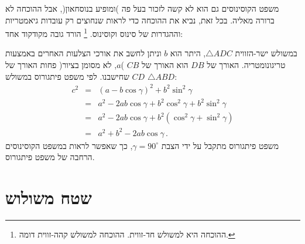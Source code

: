 \documentclass[12pt,a4paper]{article}
\begin{document}
משפט הקוסינוסים גם הוא לא קשה לזכור בעל פה )ומופיע בנוסחאון(, אבל ההוכחה לא ברורה מאליה. בכל זאת, נביא את ההוכחה כדי לראות שנחוצים רק עובדות גיאמטריות וההגדרות של סינוס וקוסינוס.%
\footnote{ההוכחה היא למשולש חד-זווית. ההוכחה למשולש קהה-זווית דומה.
}
הורד גובה מקודקוד אחד:
\begin{center}
\end{center}
במשולש ישר-הזווית
$\triangle ADC$,
היתר הוא 
$b$
וניתן לחשב את אורכי הצלעות האחרים באמצעות טריגונומטריה. האורך של
$DB$
הוא האורך של
$CB$ )$a$,
לא מסומן בציור(
פחות האורך של 
$CD$
שחישבנו. לפי משפט פיתגורוס במשולש
$\triangle ABD$:
\begin{eqnarray*}
c^2 &=& (a-b\cos\gamma)^2 + b^2\sin^2\gamma\\
&=& a^2-2ab\cos\gamma + b^2\cos^2\gamma + b^2\sin^2\gamma\\
&=& a^2-2ab\cos\gamma + b^2(\cos^2\gamma + \sin^2\gamma)\\
&=& a^2+b^2-2ab\cos\gamma\,.
\end{eqnarray*}
משפט פיתגורוס מתקבל על ידי הצבת
$\gamma=90^\circ$,
כך שאפשר לראות במשפט הקוסינוסים הרחבה של משפט פיתגורוס.


\newpage

\section{שטח משולוש}
\end{document}
